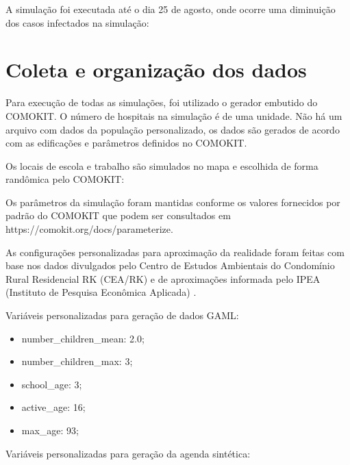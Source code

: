 
A simulação foi executada até o dia 25 de agosto, onde ocorre uma diminuição dos casos infectados na simulação:


\section{Coleta e organização dos dados}

Para execução de todas as simulações, foi utilizado o gerador embutido do COMOKIT. O número de hospitais na simulação é de uma unidade. Não há um arquivo com dados da população personalizado, os dados são gerados de acordo com as edificações e parâmetros definidos no COMOKIT.

Os locais de escola e trabalho são simulados no mapa e escolhida de forma randômica pelo COMOKIT:


Os parâmetros da simulação foram mantidas conforme os valores fornecidos por padrão do COMOKIT que podem ser consultados em https://comokit.org/docs/parameterize.

As configurações personalizadas para aproximação da realidade foram feitas com base nos dados divulgados pelo Centro de Estudos Ambientais do Condomínio Rural Residencial RK (CEA/RK) e de aproximações informada pelo IPEA (Instituto de Pesquisa Econômica Aplicada) \cite{IPEA:online}.

Variáveis personalizadas para geração de dados GAML:

\begin{itemize}
\item number\_children\_mean: 2.0;
\item number\_children\_max: 3;
\item school\_age: 3;
\item active\_age: 16;
\item max\_age: 93;
\end{itemize}


Variáveis personalizadas para geração da agenda sintética:


